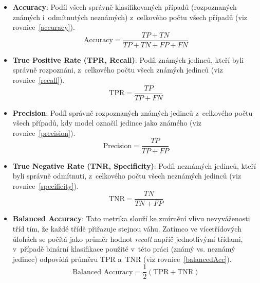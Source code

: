 \begin{itemize}
	\item \textbf{Accuracy}: Podíl všech správně klasifikovaných případů (rozpoznaných známých i~odmítnutých neznámých) z~celkového počtu všech případů (viz rovnice~\ref{accuracy}).
	\begin{equation}
		\text{Accuracy} = \frac{TP + TN}{TP + TN + FP + FN}
		\label{accuracy}
	\end{equation}
	
	\item \textbf{True Positive Rate (TPR, Recall)}: Podíl známých jedinců, kteří byli správně rozpoznáni, z~celkového počtu všech známých jedinců (viz rovnice~\ref{recall}).
	\begin{equation}
		\text{TPR} = \frac{TP}{TP + FN}
		\label{recall}
	\end{equation}
	
	\item \textbf{Precision}: Podíl správně rozpoznaných známých jedinců z~celkového počtu všech případů, kdy model označil jedince jako známého (viz rovnice~\ref{precision}).
	\begin{equation}
		\text{Precision} = \frac{TP}{TP + FP}
		\label{precision}
	\end{equation}
	
	\item \textbf{True Negative Rate (TNR, Specificity)}: Podíl neznámých jedinců, kteří byli správně odmítnuti, z~celkového počtu všech neznámých jedinců (viz rovnice~\ref{specificity}).
	\begin{equation}
		\text{TNR} = \frac{TN}{TN + FP}
		\label{specificity}
	\end{equation}

	\item \textbf{Balanced Accuracy}: Tato metrika slouží ke zmírnění vlivu nevyváženosti tříd tím, že každé třídě přiřazuje stejnou váhu. Zatímco ve vícetřídových úlohách se počítá jako průměr hodnot \textit{recall} napříč jednotlivými třídami, v~případě binární klasifikace použité v~této práci (známý vs. neznámý jedinec) odpovídá průměru TPR a~TNR (viz rovnice~\ref{balancedAcc}).
	\begin{equation}
		\text{Balanced Accuracy} = \frac{1}{2} (\text{TPR} + \text{TNR})
		\label{balancedAcc}
	\end{equation}
\end{itemize}

